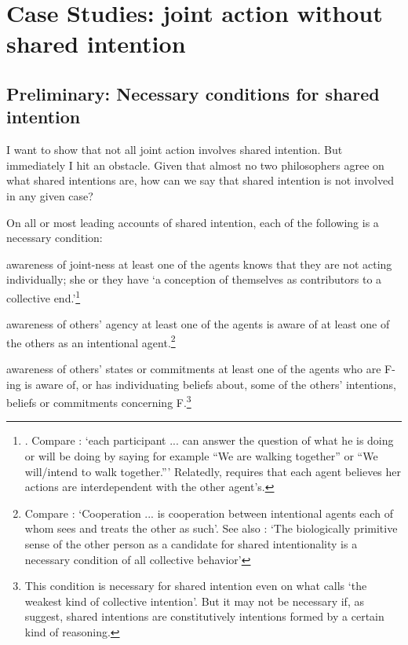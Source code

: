 \documentclass[14pt,a4paper]{extarticle}
\begin{document}
\section{Case Studies: joint action without shared intention}


\subsection{Preliminary: Necessary conditions for shared intention}

I want to show that not all joint action involves shared intention.
But immediately I hit an obstacle.
Given that almost no two philosophers agree on what shared intentions are, how can we say that shared intention is not involved in any given case?  

On all or most leading accounts of shared intention, each of the following is a necessary condition:

\begin{idescription}
\label{conditions-for-shared-intention}

\item[awareness of joint-ness] at least one of the agents knows that they are not acting individually; she or they have `a conception of themselves as contributors to a collective end.'\footnote{
	\citet[p.\ 10]{Kutz:2000si}.  Compare \citet[p.\ 361]{Roth:2004ki}: `each participant ... can answer the question of what he is doing or will be doing by saying for example ``We are walking together'' or ``We will/intend to walk together.''' 
Relatedly, \citet[p. 56]{miller_social_2001} requires that each agent believes her actions are interdependent with the other agent's.
}

\item[awareness of others' agency]  at least one of the agents is aware of at least one of the others as an intentional agent.\footnote{
	Compare \citet[p.\ 333]{Bratman:1992mi}: `Cooperation ... is cooperation between intentional agents each of whom sees and treats the other as such'.  See also \citet[p.\ 105]{Searle:1990em}: `The biologically primitive sense of the other person as a candidate for shared intentionality is a necessary condition of all collective behavior' 
}
\item[awareness of others' states or commitments] at least one of the agents who are F-ing is aware of, or has individuating beliefs about, some of the others' intentions, beliefs or commitments concerning F.\footnote{
This condition is necessary for shared intention even on what \citet[p.\ 40]{tuomela_collective_2000} calls `the weakest kind of collective intention'.  But it may not be necessary if, as \citet{Gold:2007zd} suggest, shared intentions are constitutively intentions formed by a certain kind of reasoning.
}

\end{idescription}
\end{document}
